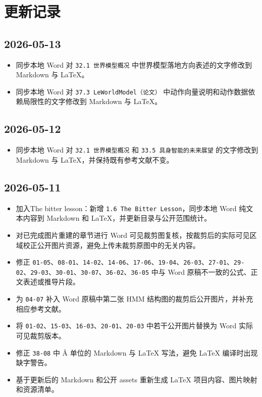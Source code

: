 \hypertarget{ux66f4ux65b0ux8bb0ux5f55}{%
\chapter{更新记录}\label{ux66f4ux65b0ux8bb0ux5f55}}

\hypertarget{section}{%
\section{2026-05-13}\label{section}}

\begin{itemize}
\tightlist
\item
  同步本地 Word 对 \texttt{32.1\ 世界模型概况} 中世界模型落地方向表述的文字修改到 Markdown 与 LaTeX。
\item
  同步本地 Word 对 \texttt{37.3\ LeWorldModel（论文）} 中动作向量说明和动作数据依赖局限性的文字修改到 Markdown 与 LaTeX。
\end{itemize}

\hypertarget{section-1}{%
\section{2026-05-12}\label{section-1}}

\begin{itemize}
\tightlist
\item
  同步本地 Word 对 \texttt{32.1\ 世界模型概况} 和 \texttt{33.5\ 具身智能的未来展望} 的文字修改到 Markdown 与 LaTeX，并保持既有参考文献不变。
\end{itemize}

\hypertarget{section-2}{%
\section{2026-05-11}\label{section-2}}

\begin{itemize}
\tightlist
\item
  加入The bitter lesson：新增 \texttt{1.6\ The\ Bitter\ Lesson}，同步本地 Word 纯文本内容到 Markdown 和 LaTeX，并更新目录与公开范围统计。
\item
  对已完成图片重建的章节进行 Word 可见裁剪图复核，按裁剪后的实际可见区域校正公开图片资源，避免上传未裁剪原图中的无关内容。
\item
  修正 \texttt{01-05}、\texttt{08-01}、\texttt{14-02}、\texttt{14-06}、\texttt{17-06}、\texttt{19-04}、\texttt{26-03}、\texttt{27-01}、\texttt{29-02}、\texttt{29-03}、\texttt{30-01}、\texttt{30-07}、\texttt{36-02}、\texttt{36-05} 中与 Word 原稿不一致的公式、正文表述或推导片段。
\item
  为 \texttt{04-07} 补入 Word 原稿中第二张 HMM 结构图的裁剪后公开图片，并补充相应参考文献。
\item
  将 \texttt{01-02}、\texttt{15-03}、\texttt{16-03}、\texttt{20-01}、\texttt{20-03} 中若干公开图片替换为 Word 实际可见裁剪版本。
\item
  修正 \texttt{38-08} 中 Å 单位的 Markdown 与 LaTeX 写法，避免 LaTeX 编译时出现缺字警告。
\item
  基于更新后的 Markdown 和公开 assets 重新生成 LaTeX 项目内容、图片映射和资源清单。
\end{itemize}

